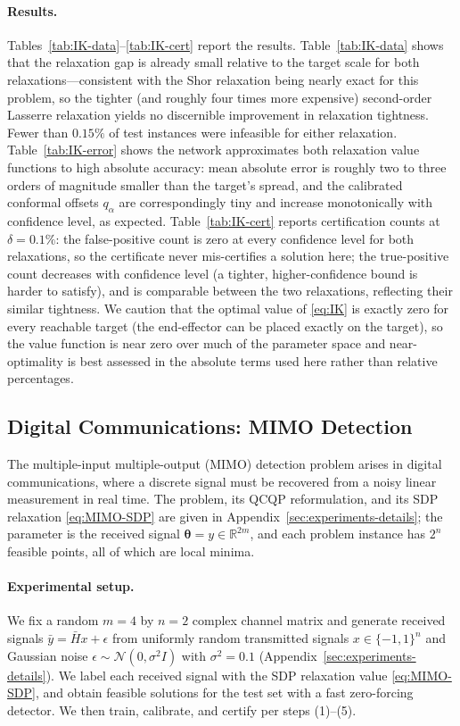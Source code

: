 \documentclass[10pt]{article} %
\theoremstyle{plain}
\theoremstyle{definition}
\theoremstyle{remark}
\begin{document}
\paragraph{Results.} Tables~\ref{tab:IK-data}--\ref{tab:IK-cert} report the results. Table~\ref{tab:IK-data} shows that the relaxation gap is already small relative to the target scale for both relaxations---consistent with the Shor relaxation being nearly exact for this problem, so the tighter (and roughly four times more expensive) second-order Lasserre relaxation yields no discernible improvement in relaxation tightness. Fewer than $0.15\%$ of test instances were infeasible for either relaxation. Table~\ref{tab:IK-error} shows the network approximates both relaxation value functions to high absolute accuracy: mean absolute error is roughly two to three orders of magnitude smaller than the target's spread, and the calibrated conformal offsets $q_\alpha$ are correspondingly tiny and increase monotonically with confidence level, as expected. Table~\ref{tab:IK-cert} reports certification counts at $\delta = 0.1\%$: the false-positive count is zero at every confidence level for both relaxations, so the certificate never mis-certifies a solution here; the true-positive count decreases with confidence level (a tighter, higher-confidence bound is harder to satisfy), and is comparable between the two relaxations, reflecting their similar tightness. We caution that the optimal value of \eqref{eq:IK} is exactly zero for every reachable target (the end-effector can be placed exactly on the target), so the value function is near zero over much of the parameter space and near-optimality is best assessed in the absolute terms used here rather than relative percentages.

\subsection{Digital Communications: MIMO Detection}

The multiple-input multiple-output (MIMO) detection problem arises in digital communications, where a discrete signal must be recovered from a noisy linear measurement in real time. The problem, its QCQP reformulation, and its SDP relaxation \eqref{eq:MIMO-SDP} are given in Appendix~\ref{sec:experiments-details}; the parameter is the received signal $\bm{\theta} = y \in \mathbb{R}^{2m}$, and each problem instance has $2^n$ feasible points, all of which are local minima.

\paragraph{Experimental setup.} We fix a random $m = 4$ by $n = 2$ complex channel matrix and generate received signals $\bar{y} = \bar{H}x + \epsilon$ from uniformly random transmitted signals $x \in \{-1, 1\}^n$ and Gaussian noise $\epsilon \sim \mathcal{N}(0, \sigma^2 I)$ with $\sigma^2 = 0.1$ (Appendix~\ref{sec:experiments-details}). We label each received signal with the SDP relaxation value \eqref{eq:MIMO-SDP}, and obtain feasible solutions for the test set with a fast zero-forcing detector. We then train, calibrate, and certify per steps (1)--(5).
\end{document}
